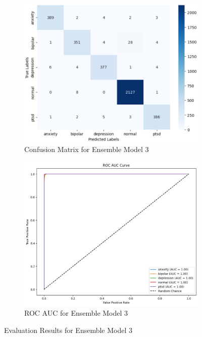 \begin{figure}[h!]
    \centering
    \begin{subfigure}[b]{0.48\textwidth}
        \centering
        \includegraphics[width=\textwidth]{Images/EM3 CM.png}
        \caption{Confusion Matrix for Ensemble Model 3}
        \label{em3 cm}  %
    \end{subfigure}
    \hfill
    \begin{subfigure}[b]{0.48\textwidth}
        \centering
        \includegraphics[width=\textwidth]{Images/EM3 ROC.png}
        \caption{ROC AUC for Ensemble Model 3}
        \label{em3 roc}  %
    \end{subfigure}
    \caption{Evaluation Results for Ensemble Model 3}
    \label{fig:ensemble_model3_comparison}
\end{figure}


